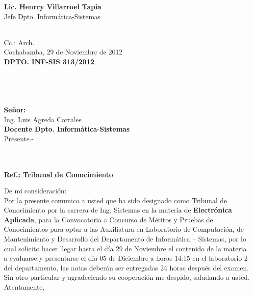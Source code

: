 \documentclass[letterpaper,11pt]{letter}
\begin{document}
\vspace{3.5cm}
\begin{center}
\begin{minipage}[b]{0.5\textwidth}
\begin{center}
{\bf Lic. Henrry Villarroel Tapia}\\
Jefe Dpto. Informática-Sistemas\\
\end{center}
\end{minipage}
\end{center}
~\\
Cc.: Arch.\\
\newpage
Cochabamba, 29 de Noviembre de 2012~\\
 \textbf{DPTO. INF-SIS 313/2012}\\
~\\
~\\
~\\
~\\
 \textbf{Señor:}~\\
Ing. Luis Agreda Corrales~\\
 \textbf{Docente Dpto. Informática-Sistemas}~\\
Presente.-\\
~\\
~\\
\begin{center}
\underline{ \textbf{Ref.: Tribunal de Conocimiento}}
\end{center}
De mi consideración:\\
Por la presente comunico a usted que ha sido designado como Tribunal de Conocimiento por la carrera de Ing. Sistemas en la materia de \textbf{Electrónica Aplicada}, para la Convocatoria a Concurso de Méritos y Pruebas de Conocimientos para optar a las Auxiliatura en Laboratorio de Computación, de Mantenimiento y Desarrollo del Departamento de Informática – Sistemas, por lo cual solicito hacer llegar hasta el día 29 de Noviembre el contenido de la materia a evaluarse y presentarse el día 05 de Diciembre a horas 14:15 en el laboratorio 2 del departamento, las notas deberán ser entregadas 24 horas después del examen.\\
Sin otro particular y agradeciendo su cooperación me despido, saludando a usted.\\
Atentamente,\\
\end{document}
